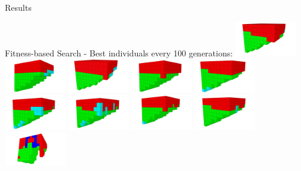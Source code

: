 \documentclass{beamer}
\begin{document}
\begin{frame}[allowframebreaks]{Results}
\begin{minipage}{\textwidth}
\begin{block}{Fitness-based Search - Best individuals every 100 generations:}
\includegraphics[width=0.2\textwidth]{figures/Robots/f_4_g_100.jpg}
\includegraphics[width=0.2\textwidth]{figures/Robots/f_4_g_200.jpg}
\includegraphics[width=0.2\textwidth]{figures/Robots/f_4_g_300.jpg}
\includegraphics[width=0.2\textwidth]{figures/Robots/f_4_g_400.jpg}
\includegraphics[width=0.2\textwidth]{figures/Robots/f_4_g_500.jpg}\\
\includegraphics[width=0.2\textwidth]{figures/Robots/f_4_g_600.jpg}
\includegraphics[width=0.2\textwidth]{figures/Robots/f_4_g_700.jpg}
\includegraphics[width=0.2\textwidth]{figures/Robots/f_4_g_800.jpg}
\includegraphics[width=0.2\textwidth]{figures/Robots/f_4_g_900.jpg}
\includegraphics[width=0.2\textwidth]{figures/Robots/f_4_g_1000.jpg}
\end{block}
\end{minipage}


\end{frame}
\end{document}
